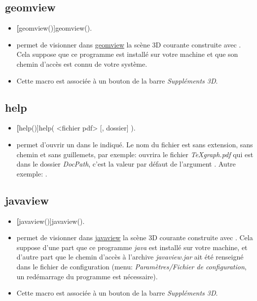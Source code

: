 \subsection{geomview}

\begin{itemize}
 \item \util \textbf[geomview()]{geomview()}.
 \item \desc permet de visionner dans \href{http://www.geomview.org/}{geomview} la scène 3D courante construite avec . Cela suppose que ce programme est installé sur votre machine et que son chemin d'accès est connu de votre système.
 \item Cette macro est associée à un bouton de la barre \textit{Suppléments 3D}.
\end{itemize}

\subsection{help}

\begin{itemize}
 \item \util \textbf[help()]{help( <fichier pdf> [, dossier] )}.
 \item \desc permet d'ouvrir un  dans le  indiqué. Le nom du fichier est sans extension, sans chemin et sans guillemets, par exemple:  ouvrira le fichier \textit{TeXgraph.pdf} qui est dans le dossier \textit{DocPath}, c'est la valeur par défaut de l'argument . Autre exemple: .
\end{itemize}

\subsection{javaview}

\begin{itemize}
 \item \util \textbf[javaview()]{javaview()}.
 \item \desc permet de visionner dans \href{http://www.javaview.de/}{javaview} la scène 3D courante construite avec . Cela suppose d'une part que ce programme \textit{java} est installé sur votre machine, et d'autre part que le chemin d'accès à l'archive \textit{javaview.jar} ait été renseigné dans le fichier de configuration (menu: \textit{Paramètres/Fichier de configuration}, un redémarrage du programme est nécessaire).
 \item Cette macro est associée à un bouton de la barre \textit{Suppléments 3D}.
\end{itemize}

